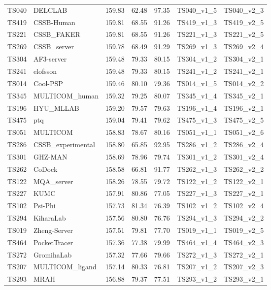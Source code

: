 \begin{table}[ht]
{\begin{tabular}{llrrrll}
TS040 & DELCLAB & 159.83 & 62.48 & 97.35 & TS040\_v1\_5 & TS040\_v2\_3 \\ 
TS419 & CSSB-Human & 159.81 & 68.55 & 91.26 & TS419\_v1\_3 & TS419\_v2\_5 \\ 
TS221 & CSSB\_FAKER & 159.81 & 68.55 & 91.26 & TS221\_v1\_3 & TS221\_v2\_5 \\ 
TS269 & CSSB\_server & 159.78 & 68.49 & 91.29 & TS269\_v1\_3 & TS269\_v2\_4 \\ 
TS304 & AF3-server & 159.48 & 79.33 & 80.15 & TS304\_v1\_2 & TS304\_v2\_1 \\ 
TS241 & elofsson & 159.48 & 79.33 & 80.15 & TS241\_v1\_2 & TS241\_v2\_1 \\ 
TS014 & Cool-PSP & 159.46 & 80.10 & 79.36 & TS014\_v1\_5 & TS014\_v2\_2 \\ 
TS345 & MULTICOM\_human & 159.32 & 79.25 & 80.07 & TS345\_v1\_4 & TS345\_v2\_1 \\ 
TS196 & HYU\_MLLAB & 159.20 & 79.57 & 79.63 & TS196\_v1\_4 & TS196\_v2\_1 \\ 
TS475 & ptq & 159.04 & 79.41 & 79.62 & TS475\_v1\_3 & TS475\_v2\_5 \\ 
TS051 & MULTICOM & 158.83 & 78.67 & 80.16 & TS051\_v1\_1 & TS051\_v2\_6 \\ 
TS286 & CSSB\_experimental & 158.80 & 65.85 & 92.95 & TS286\_v1\_2 & TS286\_v2\_4 \\ 
TS301 & GHZ-MAN & 158.69 & 78.96 & 79.74 & TS301\_v1\_2 & TS301\_v2\_4 \\ 
TS262 & CoDock & 158.58 & 66.81 & 91.77 & TS262\_v1\_3 & TS262\_v2\_2 \\ 
TS122 & MQA\_server & 158.26 & 78.55 & 79.72 & TS122\_v1\_2 & TS122\_v2\_1 \\ 
TS227 & KUMC & 157.91 & 80.86 & 77.05 & TS227\_v1\_3 & TS227\_v2\_1 \\ 
TS102 & Psi-Phi & 157.73 & 81.34 & 76.39 & TS102\_v1\_2 & TS102\_v2\_4 \\ 
TS294 & KiharaLab & 157.56 & 80.80 & 76.76 & TS294\_v1\_3 & TS294\_v2\_2 \\ 
TS019 & Zheng-Server & 157.51 & 79.81 & 77.70 & TS019\_v1\_1 & TS019\_v2\_5 \\ 
TS464 & PocketTracer & 157.36 & 77.38 & 79.99 & TS464\_v1\_4 & TS464\_v2\_3 \\ 
TS272 & GromihaLab & 157.32 & 77.66 & 79.66 & TS272\_v1\_3 & TS272\_v2\_1 \\ 
TS207 & MULTICOM\_ligand & 157.14 & 80.33 & 76.81 & TS207\_v1\_2 & TS207\_v2\_3 \\ 
TS293 & MRAH & 156.88 & 79.37 & 77.51 & TS293\_v1\_2 & TS293\_v2\_1 \\ 

\end{tabular}}
\end{table}
